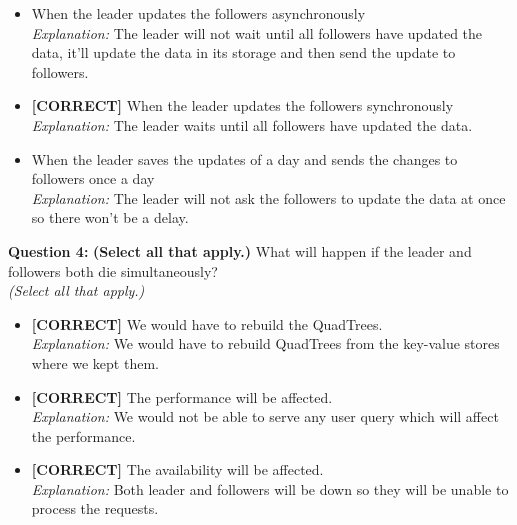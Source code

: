 \begin{itemize}
 \item When the leader updates the followers asynchronously
\\[0.1cm]
\textit{Explanation:} 
The leader will not wait until all followers have updated the data, it'll update the data in its storage and then send the update to followers.
 \item \textbf{[CORRECT]} When the leader updates the followers synchronously
\\[0.1cm]
\textit{Explanation:} 
The leader waits until all followers have updated the data.
 \item When the leader saves the updates of a day and sends the changes to followers once a day
\\[0.1cm]
\textit{Explanation:} 
The leader will not ask the followers to update the data at once so there won't be a delay.
\end{itemize}
\vspace{0.3cm}
\noindent
\textbf{Question 4:} \textbf{(Select all that apply.)} What will happen if the leader and followers both die simultaneously?
\\
\textit{(Select all that apply.)}
\\[0.2cm]
\begin{itemize}
 \item \textbf{[CORRECT]} We would have to rebuild the QuadTrees.
\\[0.1cm]
\textit{Explanation:} 
We would have to rebuild QuadTrees from the key-value stores where we kept them.
 \item \textbf{[CORRECT]} The performance will be affected.
\\[0.1cm]
\textit{Explanation:} 
We would not be able to serve any user query which will affect the performance.
 \item \textbf{[CORRECT]} The availability will be affected.
\\[0.1cm]
\textit{Explanation:} 
Both leader and followers will be down so they will be unable to process the requests.
\end{itemize}



